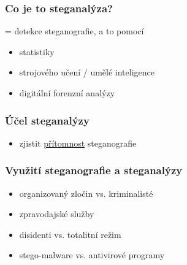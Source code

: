 \documentclass{beamer}
\begin{document}

\begin{frame}
\frametitle{Co je to steganalýza?}
= detekce steganografie, a to pomocí

\begin{itemize}
\item statistiky
\item strojového učení / umělé inteligence
\item digitální forenzní analýzy
\end{itemize}
\end{frame}


\begin{frame}
\frametitle{Účel steganalýzy}

\begin{itemize}
\item zjistit \underline{přítomnost} steganografie
\end{itemize}
\end{frame}

\begin{frame}
\frametitle{Využití steganografie a steganalýzy}

\begin{itemize}
\item<2-> organizovaný zločin vs. kriminalisté
\item<3-> zpravodajské služby
\item<4-> disidenti vs. totalitní režim
\item<5-> stego-malware vs. antivirové programy
\end{itemize}
\bigskip

\end{frame}
\end{document}
